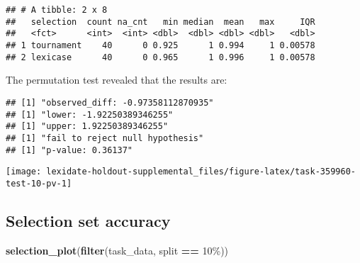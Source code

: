 \documentclass[
]{book}
\newenvironment{Shaded}{\begin{snugshade}}{\end{snugshade}}
\newcommand{\AttributeTok}[1]{\textcolor[rgb]{0.13,0.29,0.53}{#1}}
\newcommand{\DecValTok}[1]{\textcolor[rgb]{0.00,0.00,0.81}{#1}}
\newcommand{\FunctionTok}[1]{\textcolor[rgb]{0.13,0.29,0.53}{\textbf{#1}}}
\newcommand{\NormalTok}[1]{#1}
\newcommand{\OtherTok}[1]{\textcolor[rgb]{0.56,0.35,0.01}{#1}}
\newcommand{\SpecialCharTok}[1]{\textcolor[rgb]{0.81,0.36,0.00}{\textbf{#1}}}
\newcommand{\StringTok}[1]{\textcolor[rgb]{0.31,0.60,0.02}{#1}}
\begin{document}
\begin{verbatim}
## # A tibble: 2 x 8
##   selection  count na_cnt   min median  mean   max     IQR
##   <fct>      <int>  <int> <dbl>  <dbl> <dbl> <dbl>   <dbl>
## 1 tournament    40      0 0.925      1 0.994     1 0.00578
## 2 lexicase      40      0 0.965      1 0.996     1 0.00578
\end{verbatim}

The permutation test revealed that the results are:

\begin{Shaded}
\end{Shaded}

\begin{verbatim}
## [1] "observed_diff: -0.97358112870935"
## [1] "lower: -1.92250389346255"
## [1] "upper: 1.92250389346255"
## [1] "fail to reject null hypothesis"
## [1] "p-value: 0.36137"
\end{verbatim}

\texttt{[image: lexidate-holdout-supplemental\_files/figure-latex/task-359960-test-10-pv-1]}

\hypertarget{selection-set-accuracy-46}{%
\subsection{Selection set accuracy}\label{selection-set-accuracy-46}}

\begin{Shaded}
\begin{Highlighting}[]
\FunctionTok{selection\_plot}\NormalTok{(}\FunctionTok{filter}\NormalTok{(task\_data, split }\SpecialCharTok{==} \StringTok{\textquotesingle{}10\%\textquotesingle{}}\NormalTok{))}
\end{Highlighting}
\end{Shaded}
\end{document}

